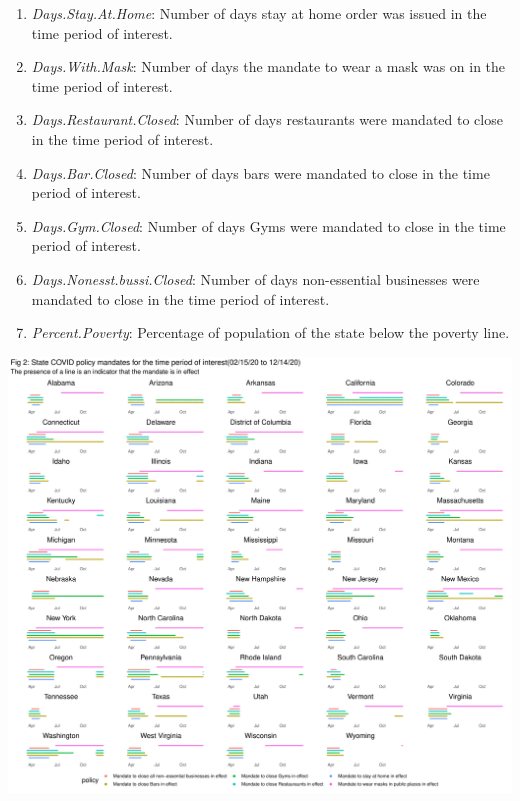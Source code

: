 \documentclass[
]{article}
\providecommand{\tightlist}{%
  \setlength{\itemsep}{0pt}\setlength{\parskip}{0pt}}
\begin{document}
\begin{enumerate}
\def\labelenumi{\arabic{enumi}.}
\tightlist
\item
  \emph{Days.Stay.At.Home}: Number of days stay at home order was issued
  in the time period of interest.
\item
  \emph{Days.With.Mask}: Number of days the mandate to wear a mask was
  on in the time period of interest.\\
\item
  \emph{Days.Restaurant.Closed}: Number of days restaurants were
  mandated to close in the time period of interest.
\item
  \emph{Days.Bar.Closed}: Number of days bars were mandated to close in
  the time period of interest.
\item
  \emph{Days.Gym.Closed}: Number of days Gyms were mandated to close in
  the time period of interest.
\item
  \emph{Days.Nonesst.bussi.Closed}: Number of days non-essential
  businesses were mandated to close in the time period of interest.
\item
  \emph{Percent.Poverty}: Percentage of population of the state below
  the poverty line.
\end{enumerate}

\includegraphics{Final_Report_files/figure-latex/unnamed-chunk-1-1.pdf}
\end{document}
